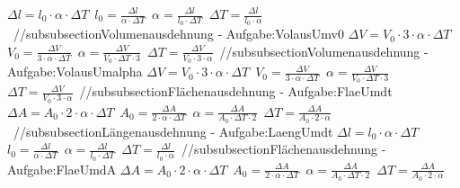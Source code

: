 $ \Delta l = l_{0} \cdot \alpha \cdot \Delta T $\ 
$ l_{0}  = \frac{ \Delta l}{\alpha \cdot \Delta T} $\ 
$ \alpha  = \frac{ \Delta l}{l_{0} \cdot \Delta T} $\ 
$ \Delta T = \frac{ \Delta l}{l_{0} \cdot \alpha } $\ 
//subsubsection{Volumenausdehnung - Aufgabe:VolausUmv0} 
$ \Delta V = V_{0} \cdot 3\cdot \alpha \cdot \Delta T $\ 
$ V_{0}  = \frac{  \Delta V}{3\cdot \alpha \cdot \Delta T} $\ 
$ \alpha  = \frac{  \Delta V}{V_{0} \cdot \Delta T\cdot 3} $\ 
$ \Delta T = \frac{  \Delta V}{V_{0} \cdot 3\cdot \alpha } $\ 
//subsubsection{Volumenausdehnung - Aufgabe:VolausUmalpha} 
$ \Delta V = V_{0} \cdot 3\cdot \alpha \cdot \Delta T $\ 
$ V_{0}  = \frac{  \Delta V}{3\cdot \alpha \cdot \Delta T} $\ 
$ \alpha  = \frac{  \Delta V}{V_{0} \cdot \Delta T\cdot 3} $\ 
$ \Delta T = \frac{  \Delta V}{V_{0} \cdot 3\cdot \alpha } $\ 
//subsubsection{Flächenausdehnung - Aufgabe:FlaeUmdt} 
$ \Delta A = A_{0} \cdot 2\cdot \alpha \cdot \Delta T $\ 
$ A_{0}  = \frac{ \Delta A}{2\cdot \alpha \cdot \Delta T} $\ 
$ \alpha  = \frac{ \Delta A}{A_{0} \cdot \Delta T\cdot 2} $\ 
$ \Delta T = \frac{ \Delta A}{A_{0} \cdot 2\cdot \alpha } $\ 
//subsubsection{Längenausdehnung - Aufgabe:LaengUmdt} 
$ \Delta l = l_{0} \cdot \alpha \cdot \Delta T $\ 
$ l_{0}  = \frac{ \Delta l}{\alpha \cdot \Delta T} $\ 
$ \alpha  = \frac{ \Delta l}{l_{0} \cdot \Delta T} $\ 
$ \Delta T = \frac{ \Delta l}{l_{0} \cdot \alpha } $\ 
//subsubsection{Flächenausdehnung - Aufgabe:FlaeUmdA} 
$ \Delta A = A_{0} \cdot 2\cdot \alpha \cdot \Delta T $\ 
$ A_{0}  = \frac{ \Delta A}{2\cdot \alpha \cdot \Delta T} $\ 
$ \alpha  = \frac{ \Delta A}{A_{0} \cdot \Delta T\cdot 2} $\ 
$ \Delta T = \frac{ \Delta A}{A_{0} \cdot 2\cdot \alpha } $\ 
